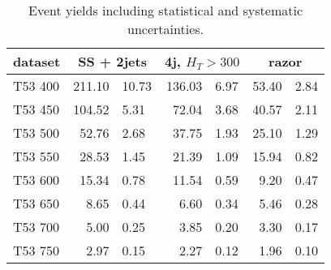 \begin{table}
    \centering
    \begin{tabular}{l *3{r@{$\pm$}l}}
        \toprule
        dataset & \multicolumn{2}{c}{SS + 2jets}& \multicolumn{2}{c}{4j, $H_T >
        300$}& \multicolumn{2}{c}{razor} \\
        \midrule
        T53 400& 211.10 & 10.73& 136.03 & 6.97& 53.40 & 2.84\\
        T53 450& 104.52 & 5.31& 72.04 & 3.68& 40.57 & 2.11\\
        T53 500& 52.76 & 2.68& 37.75 & 1.93& 25.10 & 1.29\\
        T53 550& 28.53 & 1.45& 21.39 & 1.09& 15.94 & 0.82\\
        T53 600& 15.34 & 0.78& 11.54 & 0.59& 9.20 & 0.47\\
        T53 650& 8.65 & 0.44& 6.60 & 0.34& 5.46 & 0.28\\
        T53 700& 5.00 & 0.25& 3.85 & 0.20& 3.30 & 0.17\\
        T53 750& 2.97 & 0.15& 2.27 & 0.12& 1.96 & 0.10\\
        \bottomrule
    \end{tabular}
    \caption{Event yields including statistical and systematic uncertainties.}
\end{table}

